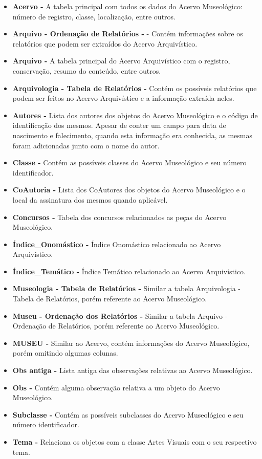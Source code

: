 \documentclass[a4paper,12pt,oneside,onecolumn,final,fleqn]{repUERJ}
\begin{document}
\begin{itemize}
	\item \textbf{Acervo -} A tabela principal com todos os dados do Acervo Museológico: número de registro, classe, localização, entre outros.
	\item \textbf{Arquivo - Ordenação de Relatórios -} - Contém informações sobre os relatórios que podem ser extraídos do Acervo Arquivístico.
	\item \textbf{Arquivo -} A tabela principal do Acervo Arquivístico com o registro, conservação, resumo do conteúdo, entre outros.
	\item \textbf{Arquivologia - Tabela de Relatórios -} Contém os possíveis relatórios que podem ser feitos no Acervo Arquivístico e a informação extraída neles.
	\item \textbf{Autores -} Lista dos autores dos objetos do Acervo Museológico e o código de identificação dos mesmos. Apesar de conter um campo para data de nascimento e falecimento, quando esta informação era conhecida, as mesmas foram adicionadas junto com o nome do autor.
	\item \textbf{Classe -} Contém as possíveis classes do Acervo Museológico e seu número identificador.
	\item \textbf{CoAutoria -} Lista dos CoAutores dos objetos do Acervo Museológico e o local da assinatura dos mesmos quando aplicável.
	\item \textbf{Concursos -} Tabela dos concursos relacionados as peças do Acervo Museológico.
	\item \textbf{Índice\_Onomástico -} Índice Onomástico relacionado ao Acervo Arquivístico.
	\item \textbf{Índice\_Temático -} Índice Temático relacionado ao Acervo Arquivístico.
	\item \textbf{Museologia - Tabela de Relatórios -} Similar a tabela Arquivologia - Tabela de Relatórios, porém referente ao Acervo Museológico.
	\item \textbf{Museu - Ordenação dos Relatórios -} Similar a tabela Arquivo - Ordenação de Relatórios, porém referente ao Acervo Museológico.
	\item \textbf{MUSEU -} Similar ao Acervo, contém informações do Acervo Museológico, porém omitindo algumas colunas.
	\item \textbf{Obs antiga -} Lista antiga das observações relativas ao Acervo Museológico.
	\item \textbf{Obs -} Contém alguma observação relativa a um objeto do Acervo Museológico.
	\item \textbf{Subclasse -} Contém as possíveis subclasses do Acervo Museológico e seu número identificador.
	\item \textbf{Tema -} Relaciona os objetos com a classe Artes Visuais com o seu respectivo tema.
\end{itemize}
\end{document}
